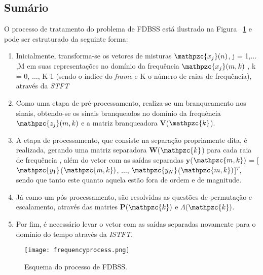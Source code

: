     \subsection{Sumário}
        O processo de tratamento do problema de FDBSS está ilustrado na Figura ~\ref{fig:frequencymodel} e pode ser estruturado da seguinte forma:
        
        \begin{enumerate}
            \item Inicialmente, transforma-se os vetores de misturas $\mathpzc{x_j}(n)$, j = 1,$\dots$,M em suas representações no domínio da frequência $\mathpzc{x_j}(m,k)$ , k = 0, $\dots$, K-1 (sendo  o índice do \textit{frame} e K o número de raias de frequência), através da \textit{STFT}
            
            \item Como uma etapa de pré-processamento, realiza-se um branqueamento nos sinais, obtendo-se os sinais branqueados no domínio da frequência  $\mathpzc{z_j}(m,k)$ e a matriz branqueadora $\mathbf{V}$($\mathpzc{k}$).
            
            \item A etapa de processamento, que consiste na separação propriamente dita, é realizada, gerando uma matriz separadora $\mathbf{W}$($\mathpzc{k}$) para cada raia de frequência , além do vetor com as saídas separadas $\mathbf{y}$($\mathpzc{m,k})$ = [$\mathpzc{y_1}$($\mathpzc{m,k})$, $\dots$, $\mathpzc{y_N}$($\mathpzc{m,k})$]$^T$, sendo que tanto este quanto aquela estão fora de ordem e de magnitude.
            
            \item Já como um pós-processamento, são resolvidas as questões de permutação e escalamento, através das matries $\mathbf{P}$($\mathpzc{k})$ e $\Lambda$($\mathpzc{k})$.
            
            \item Por fim, é necessário levar o vetor com as saídas separadas novamente para o domínio do tempo através da \textit{ISTFT}.
            
        \end{enumerate}

        \begin{figure}[h!]
            \texttt{[image: frequencyprocess.png]}
            \caption{Esquema do processo de FDBSS.}
            \label{fig:frequencymodel}
        \end{figure}


